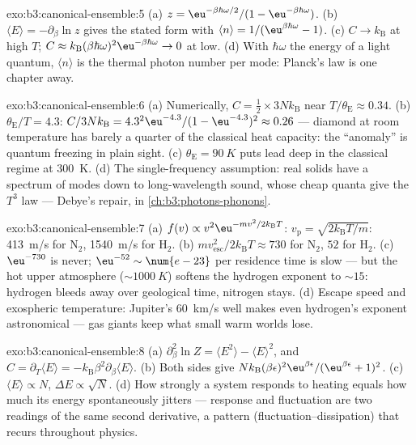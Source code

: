 \begin{solution}{exo:b3:canonical-ensemble:5}
(a) $z = \eu^{-\beta\hbar\omega/2}/(1 - \eu^{-\beta\hbar\omega})$.
(b) $\langle E\rangle = -\partial_\beta\ln z$ gives the stated
form with $\langle n\rangle = 1/(\eu^{\beta\hbar\omega} - 1)$. (c)
$C \to k_{\text{B}}$ at high $T$; $C \approx k_{\text{B}}(\beta
\hbar\omega)^2\eu^{-\beta\hbar\omega} \to 0$ at low. (d) With
$\hbar\omega$ the energy of a light quantum, $\langle n\rangle$ is
the thermal photon number per mode: Planck's law is one chapter
away.
\end{solution}

\begin{solution}{exo:b3:canonical-ensemble:6}
(a) Numerically, $C = \tfrac12 \times 3Nk_{\text{B}}$ near
$T/\theta_{\text{E}} \approx 0.34$. (b) $\theta_{\text{E}}/T =
4.3$: $C/3Nk_{\text{B}} = 4.3^2\eu^{-4.3}/(1 - \eu^{-4.3})^2
\approx 0.26$ --- diamond at room temperature has barely a quarter
of the classical heat capacity: the ``anomaly'' is quantum
freezing in plain sight. (c) $\theta_{\text{E}} = \qty{90}{K}$
puts lead deep in the classical regime at \qty{300}{K}. (d) The
single-frequency assumption: real solids have a spectrum of modes
down to long-wavelength sound, whose cheap quanta give the $T^3$
law --- Debye's repair, in \cref{ch:b3:photons-phonons}.
\end{solution}

\begin{solution}{exo:b3:canonical-ensemble:7}
(a) $f(v) \propto v^2\eu^{-mv^2/2k_{\text{B}}T}$: $v_{\text{p}} =
\sqrt{2k_{\text{B}}T/m}$: \qty{413}{m/s} for N$_2$,
\qty{1540}{m/s} for H$_2$. (b) $mv_{\text{esc}}^2/2k_{\text{B}}T
\approx 730$ for N$_2$, $52$ for H$_2$. (c) $\eu^{-730}$ is
never; $\eu^{-52} \sim \num{e-23}$ per residence time is slow ---
but the hot upper atmosphere ($\sim\qty{1000}{K}$) softens the
hydrogen exponent to $\sim15$: hydrogen bleeds away over
geological time, nitrogen stays. (d) Escape speed and exospheric
temperature: Jupiter's \qty{60}{km/s} well makes even hydrogen's
exponent astronomical --- gas giants keep what small warm worlds
lose.
\end{solution}

\begin{solution}{exo:b3:canonical-ensemble:8}
(a) $\partial_\beta^2\ln Z = \langle E^2\rangle - \langle
E\rangle^2$, and $C = \partial_T\langle E\rangle =
-k_{\text{B}}\beta^2\partial_\beta\langle E\rangle$. (b) Both
sides give $Nk_{\text{B}}(\beta\epsilon)^2\eu^{\beta\epsilon}/(
\eu^{\beta\epsilon} + 1)^2$. (c) $\langle E\rangle \propto N$,
$\Delta E \propto \sqrt N$. (d) How strongly a system responds to
heating equals how much its energy spontaneously jitters ---
response and fluctuation are two readings of the same second
derivative, a pattern (fluctuation--dissipation) that recurs
throughout physics.
\end{solution}

